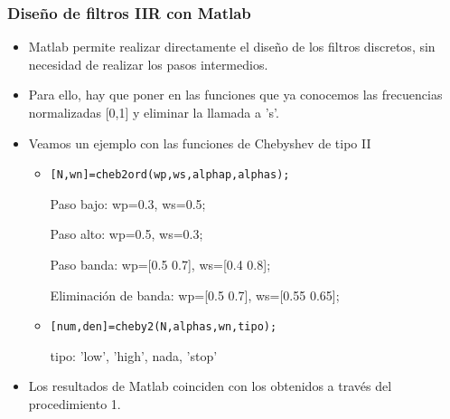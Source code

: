 \documentclass[handout]{beamer}
\numberwithin{section}{part}
\begin{document}
\begin{frame}
\frametitle{Diseño de filtros  IIR con Matlab}
\footnotesize
\begin{itemize}
\item Matlab permite realizar directamente el diseño de los filtros discretos, sin necesidad de realizar los pasos intermedios.
\item Para ello, hay que poner en las funciones que ya conocemos las frecuencias normalizadas [0,1] y eliminar la llamada a 's'.

\item Veamos un ejemplo con las funciones de Chebyshev de tipo II
\begin{itemize}
\item \alert{\texttt{[N,wn]=cheb2ord(wp,ws,alphap,alphas);}}

\vspace{0.1cm}

{\footnotesize
\hspace{0.5cm}Paso bajo: wp=0.3, ws=0.5;

\vspace{0.1cm}

\hspace{0.5cm}Paso alto: wp=0.5, ws=0.3;

\vspace{0.1cm}

\hspace{0.5cm}Paso banda: wp=[0.5 0.7], ws=[0.4 0.8];

\vspace{0.1cm}

\hspace{0.5cm}Eliminación de banda: wp=[0.5 0.7], ws=[0.55 0.65];}

\vspace{0.1cm}

\item\alert{\texttt{[num,den]=cheby2(N,alphas,wn,tipo);}}

\vspace{0.1cm}

\hspace{0.5cm}tipo: 'low', 'high', nada, 'stop'

\end{itemize}


\item Los resultados de Matlab coinciden con los obtenidos a través del procedimiento 1.

\end{itemize}

\end{frame}
\end{document}
